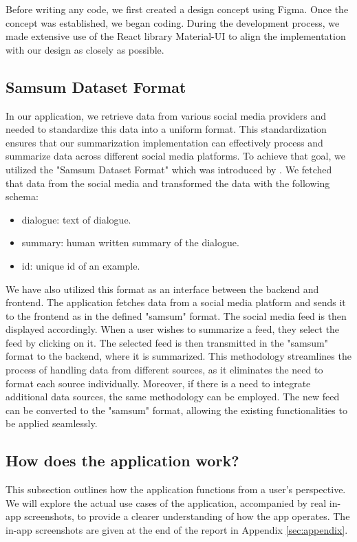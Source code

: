 Before writing any code, we first created a design concept using Figma. Once the concept was established, we began coding. During the development process, we made extensive use of the React library Material-UI to align the implementation with our design as closely as possible.

\subsection{Samsum Dataset Format}\label{subsec:samsum}

In our application, we retrieve data from various social media providers and needed to standardize this data into a uniform format. This standardization ensures that our summarization implementation can effectively process and summarize data across different social media platforms. To achieve that goal, we utilized the "Samsum Dataset Format" which was introduced by \cite{samsum}. We fetched that data from the social media and transformed the data with the following schema:
\begin{itemize}
    \item dialogue: text of dialogue.
    \item summary: human written summary of the dialogue.
    \item id: unique id of an example.
\end{itemize}

We have also utilized this format as an interface between the backend and frontend. The application fetches data from a social media platform and sends it to the frontend as in the defined "samsum" format. The social media feed is then displayed accordingly. When a user wishes to summarize a feed, they select the feed by clicking on it. The selected feed is then transmitted in the "samsum" format to the backend, where it is summarized. This methodology streamlines the process of handling data from different sources, as it eliminates the need to format each source individually. Moreover, if there is a need to integrate additional data sources, the same methodology can be employed. The new feed can be converted to the "samsum" format, allowing the existing functionalities to be applied seamlessly.
 
\subsection{How does the application work?}\label{subsec:how_app_work}
This subsection outlines how the application functions from a user's perspective. We will explore the actual use cases of the application, accompanied by real in-app screenshots, to provide a clearer understanding of how the app operates. The in-app screenshots are given at the end of the report in Appendix \ref{sec:appendix}.

